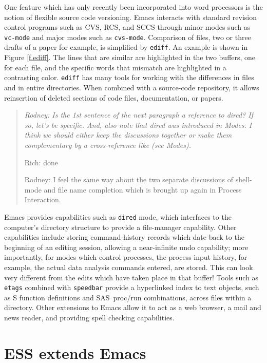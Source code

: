 \documentclass{article}
\newcommand*{\SAS}{\textsc{SAS}}
\newcommand{\stexttt}[1]{{\small\texttt{#1}}}
\newenvironment{Comment}{\begin{quote}\small\itshape }{\end{quote}}
\begin{document}
One feature which has only recently been incorporated into word
processors is the notion of flexible source code versioning.  Emacs
interacts with standard revision control programs such as CVS,
RCS, and SCCS through minor modes such as \stexttt{vc-mode} and major modes
such as \stexttt{cvs-mode}.
Comparison of files, two or three drafts of a paper for example, is
simplified by \stexttt{ediff}.  An example is shown in Figure
\ref{f.ediff}.  The lines that are similar are highlighted in the two
buffers, one for each file, and the specific words that mismatch are
highlighted in a contrasting color.  \stexttt{ediff} has many tools
for working with the differences in files and in entire directories.
When combined with a source-code repository, it allows reinsertion of
deleted sections of code files, documentation, or papers.

\begin{Comment} Rodney: Is the 1st sentence of the next paragraph
a reference to dired?  If so, let's be specific.  And, also note that 
dired was introduced in Modes.  I think we should either keep the 
discussions together or make them complementary by a cross-reference
like (see Modes).  

Rich: done

Rodney: I feel the same way about the two separate discussions 
of shell-mode and file name completion which is brought up again in 
Process Interaction.
\end{Comment}

Emacs provides capabilities such as
\stexttt{dired} mode,
which interfaces to the computer's directory structure to provide a
file-manager capability.  Other capabilities include storing
command-history records which date back to the beginning of an editing
session, allowing a near-infinite undo capability; more importantly,
for modes which control processes, the process input history, for
example, the actual data analysis commands entered, are stored.  This
can look very different from the edits which have taken place in that
buffer!  Tools such as \stexttt{etags} combined with \stexttt{speedbar}
provide a hyperlinked index to text objects, such as S function
definitions and \SAS\ proc/run combinations, across files within a
directory.  Other extensions to Emacs allow it to act as a web
browser, a mail and news reader, and providing spell checking
capabilities.


\section{ESS extends Emacs}
\label{sec:ess-extends-emacs}
\end{document}
